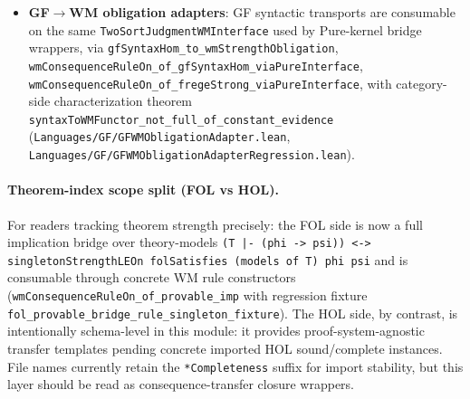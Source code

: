 \documentclass[]{article}
\newcommand{\code}[1]{\texttt{#1}}
\begin{document}
\begin{itemize}[leftmargin=2em]
  \code{modalSubobject\_commDi\_bc\_graph\_endpoint\_of\_pathSemLiftPkg},
  \code{mettaFull\_modalSubobject\_commDi\_bc\_graph\_endpoint},
  \code{oslf\_formula\_ntt\_graph\_triangle\_categorical}. The closure layer
  now also exposes an evidence-first endpoint
  \code{semE\_fragment\_formulaCategoricalEndpoint\_step} plus regression
  projection
  \code{semE\_fragment\_categorical\_endpoint\_step\_fixture}, so the
  institution/Beck-Chevalley endpoint and one-step semE evidence closure are
  consumable together before any strength-view lift assumptions. Direct
  fixtures include
  regression fixtures
  \code{formula\_graph\_triangle\_fixture} and
  \code{formula\_graph\_triangle\_categorical\_fixture}
  (\code{OSLF/Framework/ModalSubobjectBridge.lean},
   \code{OSLF/Framework/OSLFNTTWMBridge.lean},
   \code{OSLF/Framework/OSLFNTTTheoryClosure.lean},
   \code{OSLF/Framework/OSLFNTTWMBridgeRegression.lean}).
\item \textbf{GF$\rightarrow$WM obligation adapters}:
  GF syntactic transports are consumable on the same
  \code{TwoSortJudgmentWMInterface} used by Pure-kernel bridge wrappers,
  via
  \code{gfSyntaxHom\_to\_wmStrengthObligation},
  \code{wmConsequenceRuleOn\_of\_gfSyntaxHom\_viaPureInterface},
  \code{wmConsequenceRuleOn\_of\_fregeStrong\_viaPureInterface}, with
  category-side characterization theorem
  \code{syntaxToWMFunctor\_not\_full\_of\_constant\_evidence}
  (\code{Languages/GF/GFWMObligationAdapter.lean},
   \code{Languages/GF/GFWMObligationAdapterRegression.lean}).
\end{itemize}

\paragraph{Theorem-index scope split (FOL vs HOL).}
For readers tracking theorem strength precisely: the FOL side is now a full
implication bridge over theory-models
\code{(T |- (phi -> psi)) <-> singletonStrengthLEOn folSatisfies (models of T) phi psi}
and is consumable through concrete WM rule constructors
(\code{wmConsequenceRuleOn\_of\_provable\_imp} with regression fixture
\code{fol\_provable\_bridge\_rule\_singleton\_fixture}). The HOL side, by
contrast, is intentionally schema-level in this module: it provides
proof-system-agnostic transfer templates pending concrete imported HOL
sound/complete instances. File names currently retain the
\code{*Completeness} suffix for import stability, but this layer should be
read as consequence-transfer closure wrappers.
\end{document}
